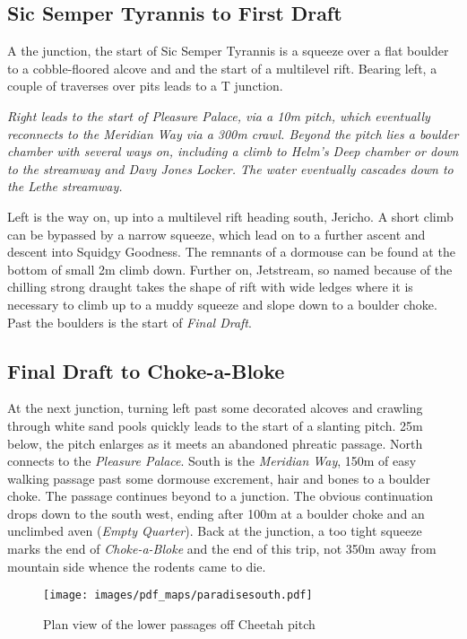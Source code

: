 \subsection{Sic Semper Tyrannis to First Draft}
A the junction, the start of Sic Semper Tyrannis is a squeeze over a flat boulder to a cobble-floored alcove and and the start of a multilevel rift. Bearing left, a couple of traverses over pits leads to a T junction. 

\textit{Right leads to the start of \emph{Pleasure Palace}, via a 10m pitch, which eventually reconnects to the \emph{Meridian Way} via a 300m crawl. Beyond the pitch lies a boulder chamber with several ways on, including a climb to \emph{Helm's Deep} chamber or down to the streamway and \emph{Davy Jones Locker}. The water eventually cascades down to the \emph{Lethe} streamway.}

Left is the way on, up into a multilevel rift heading south, Jericho. A short climb can be bypassed by a narrow squeeze, which lead on to a further ascent and descent into Squidgy Goodness. The remnants of a dormouse can be found at the bottom of small 2m climb down. Further on, Jetstream, so named because of the chilling strong draught takes the shape of rift with wide ledges where it is necessary to climb up to a muddy squeeze and slope down to a boulder choke. Past the boulders is the start of \emph{Final Draft}.

\subsection{Final Draft to Choke-a-Bloke}
At the next junction, turning left past some decorated alcoves and crawling through white sand pools quickly leads to the start of a slanting pitch. 25m below, the pitch enlarges as it meets an abandoned phreatic passage. North connects to the \emph{Pleasure Palace}. South is the \emph{Meridian Way}, 150m of easy walking passage past some dormouse excrement, hair and bones to a boulder choke. The passage continues beyond to a junction. The obvious continuation drops down to the south west, ending after 100m at a boulder choke and an unclimbed aven (\emph{Empty Quarter}). Back at the junction, a too tight squeeze marks the end of \emph{Choke-a-Bloke} and the end of this trip, not 350m away from mountain side whence the rodents came to die.



\begin{figure*}[t!]
\checkoddpage \ifoddpage \forcerectofloat \else \forceversofloat \fi
\centering
\texttt{[image: images/pdf\_maps/paradisesouth.pdf]}
\caption{Plan view of the lower passages off Cheetah pitch}
\label{paradise}
\end{figure*}